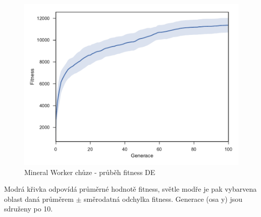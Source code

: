 \begin{figure}[t]\centering
	\includegraphics[width=\columnwidth]{../img/MineralMap/MineralWorkerWalk}
	\caption{Mineral Worker chůze -  průběh fitness DE}
	\label{obr04:MineralWorkerWalk}
\end{figure}
Modrá křivka odpovídá průměrné hodnotě fitness, světle modře je pak vybarvena oblast daná průměrem $\pm$ směrodatná odchylka fitness. Generace (osa y) jsou sdruženy po 10. 
\clearpage

